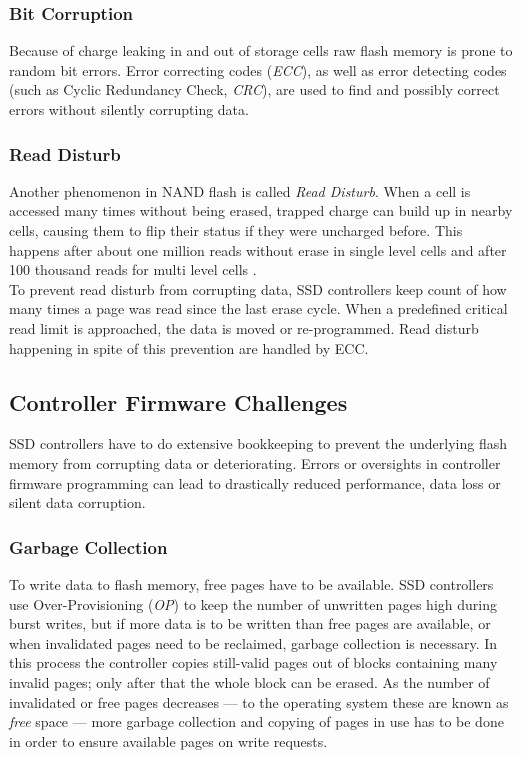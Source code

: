 \documentclass{acm_proc_article-sp}
\begin{document}
\subsubsection*{Bit Corruption}
Because of charge leaking in and out of storage cells raw flash memory is prone to random bit errors. Error correcting codes (\emph{ECC}), as well as error detecting codes (such as Cyclic Redundancy Check, \emph{CRC}), are used to find and possibly correct errors without silently corrupting data.

\subsubsection*{Read Disturb}
Another phenomenon in NAND flash is called \emph{Read Disturb}. When a cell is accessed many times without being erased, trapped charge can build up in nearby cells, causing them to flip their status if they were uncharged before.
This happens after about one million reads without erase in single level cells and after 100 thousand reads for multi level cells \cite{cooke2007inconvenient}.
\\
To prevent read disturb from corrupting data, SSD controllers keep count of how many times a page was read since the last erase cycle. When a predefined critical read limit is approached, the data is moved or re-programmed. Read disturb happening in spite of this prevention are handled by ECC.

\subsection{Controller Firmware Challenges}
SSD controllers have to do extensive bookkeeping to prevent the underlying flash memory from corrupting data or deteriorating. Errors or oversights in controller firmware programming can lead to drastically reduced performance, data loss or silent data corruption.

\subsubsection*{Garbage Collection}
To write data to flash memory, free pages have to be available. SSD controllers use Over-Provisioning (\emph{OP}) to keep the number of unwritten pages high during burst writes, but if more data is to be written than free pages are available, or when invalidated pages need to be reclaimed, garbage collection is necessary. In this process the controller copies still-valid pages out of blocks containing many invalid pages; only after that the whole block can be erased. As the number of invalidated or free pages decreases --- to the operating system these are known as \emph{free} space --- more garbage collection and copying of pages in use has to be done in order to ensure available pages on write requests.
\end{document}
